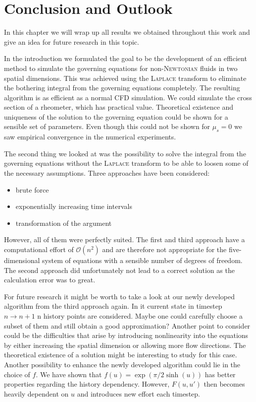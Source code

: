 \documentclass[12pt,a4paper,twoside, open=right]{scrreprt}
\theoremstyle{definition}
\theoremstyle{plain}
\begin{document}
\chapter{Conclusion and Outlook}
In this chapter we will wrap up all results we obtained throughout this work and give an idea for future research in this topic. \par 
In the introduction we formulated the goal to be the development of an efficient method to simulate the governing equations for non-\textsc{Newtonian} fluids in two spatial dimensions. This was achieved using the \textsc{Laplace} transform to eliminate the bothering integral from the governing equations completely. The resulting algorithm is as efficient as a normal CFD simulation. We could simulate the cross section of a rheometer, which has practical value. Theoretical existence and uniqueness of the solution to the governing equation could be shown for a sensible set of parameters. Even though this could not be shown for $\mu_s=0$ we saw empirical convergence in the numerical experiments. \par 
The second thing we looked at was the possibility to solve the integral from the governing equations without the \textsc{Laplace} transform to be able to loosen some of the necessary assumptions. Three approaches have been considered:
\begin{itemize}
    \item brute force
    \item exponentially increasing time intervals
    \item transformation of the argument
\end{itemize}
However, all of them were perfectly suited. The first and third approach have a computational effort of $\mathcal{O}(n^2)$ and are therefore not appropriate for the five-dimensional system of equations with a sensible number of degrees of freedom. The second approach did unfortunately not lead to a correct solution as the calculation error was to great. \\
\par 
For future research it might be worth to take a look at our newly developed algorithm from the third approach again. In it current state in timestep $n\to n+1$ n history points are considered. Maybe one could carefully choose a subset of them and still obtain a good approximation? Another point to consider could be the difficulties that arise by introducing nonlinearity into the equations by either increasing the spatial dimension or allowing more flow directions. The theoretical existence of a solution might be interesting to study for this case. Another possibility to enhance the newly developed algorithm could lie in the choice of $f$. We have shown that $f(u)=\exp(\pi/2\sinh(u))$ has better properties regarding the history dependency. However, $F(u,u')$ then becomes heavily dependent on $u$ and introduces new effort each timestep.\\
\end{document}

